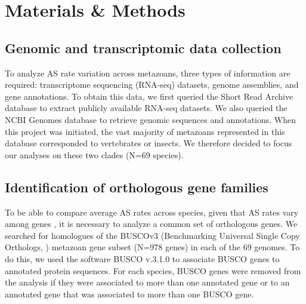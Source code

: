 \section{Materials \& Methods}
\label{sec:MaterialsMethodsAS}

\subsection{Genomic and transcriptomic data collection}
To analyze AS rate variation across metazoans, three types of information are required: transcriptome sequencing (RNA-seq) datasets, genome assemblies, and gene annotations. To obtain this data, we first queried the Short Read Archive database \citep{leinonen_sequence_2011} to extract publicly available RNA-seq datasets. We also queried the NCBI Genomes database \citep{ncbi_resource_coordinators_database_2018} to retrieve genomic sequences and annotations. When this project was initiated, the vast majority of metazoans represented in this database corresponded to vertebrates or insects. We therefore decided to focus our analyses on these two clades (N=69 species).

\subsection{Identification of orthologous gene families}
To be able to compare average AS rates across species, given that AS rates vary among genes \citep{saudemont_fitness_2017}, it is necessary to analyze a common set of orthologous genes. We searched for homologues of the \acrshort{BUSCO}v3 (Benchmarking Universal Single Copy Orthologs, \citep{seppey_busco_2019}) metazoan gene subset (N=978 genes) in each of the 69 genomes. To do this, we used the software \acrshort{BUSCO} v.3.1.0 to associate \acrshort{BUSCO} genes to annotated protein sequences. For each species, \acrshort{BUSCO} genes were removed from the analysis if they were associated to more than one annotated gene or to an annotated gene that was associated to more than one \acrshort{BUSCO} gene.

